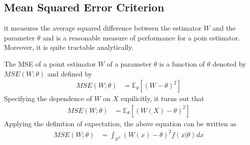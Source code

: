 \documentclass[a4paper,english,12pt]{article}
\begin{document}
\subsection{Mean Squared Error Criterion}
it measures the average squared difference between the estimator $W$ and the parameter $\theta$ and is a reasonable measure of performance for a poin estimator. Moreover, it is quite tractable analytically.
\begin{defn}
The MSE of a point estimator $W$ of a parameter $\theta$ is a function of $\theta$ denoted by $MSE(W ; \theta)$ and defined by
\begin{align*}
MSE(W ; \theta) &= \mathbb{E}_\theta[(W - \theta)^2]
\end{align*}
Specifying the dependence of $W$ on $X$ expilicitly, it turns out that
\begin{align*}
MSE(W ; \theta) &= \mathbb{E}_\theta[(W(X) - \theta)^2]
\end{align*}
Applying the definition of expectation, the above equation can be written as
\begin{align*}
MSE(W ; \theta) &= \int_{\mathbb{R}^n} (W(x) - \theta)^2 f(x | \theta) dx
\end{align*} 
\end{defn}
\end{document}

